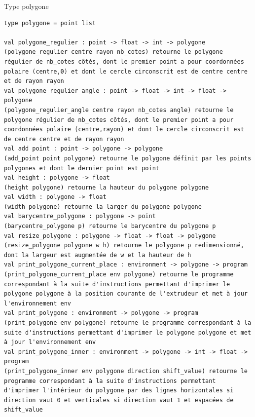 \documentclass[11pt, titlepage]{article}
\begin{document}
Type polygone
\begin{lstlisting}
type polygone = point list
	    
val polygone_regulier : point -> float -> int -> polygone
(polygone_regulier centre rayon nb_cotes) retourne le polygone régulier de nb_cotes côtés, dont le premier point a pour coordonnées polaire (centre,0) et dont le cercle circonscrit est de centre centre et de rayon rayon
val polygone_regulier_angle : point -> float -> int -> float -> polygone
(polygone_regulier_angle centre rayon nb_cotes angle) retourne le polygone régulier de nb_cotes côtés, dont le premier point a pour coordonnées polaire (centre,rayon) et dont le cercle circonscrit est de centre centre et de rayon rayon
val add point : point -> polygone -> polygone
(add_point point polygone) retourne le polygone définit par les points polygones et dont le dernier point est point
val height : polygone -> float
(height polygone) retourne la hauteur du polygone polygone
val width : polygone -> float
(width polygone) retourne la larger du polygone polygone
val barycentre_polygone : polygone -> point
(barycentre_polygone p) retourne le barycentre du polygone p
val resize_polygone : polygone -> float -> float -> polygone 
(resize_polygone polygone w h) retourne le polygone p redimensionné, dont la largeur est augmentée de w et la hauteur de h
val print_polygone_current_place : environment -> polygone -> program
(print_polygone_current_place env polygone) retourne le programme correspondant à la suite d'instructions permettant d'imprimer le polygone polygone à la position courante de l'extrudeur et met à jour l'environnement env
val print_polygone : environment -> polygone -> program
(print_polygone env polygone) retourne le programme correspondant à la suite d'instructions permettant d'imprimer le polygone polygone et met à jour l'environnement env
val print_polygone_inner : environment -> polygone -> int -> float -> program
(print_polygone_inner env polygone direction shift_value) retourne le programme correspondant à la suite d'instructions permettant d'imprimer l'intérieur du polygone par des lignes horizontales si direction vaut 0 et verticales si direction vaut 1 et espacées de shift_value
\end{lstlisting}
\end{document}
